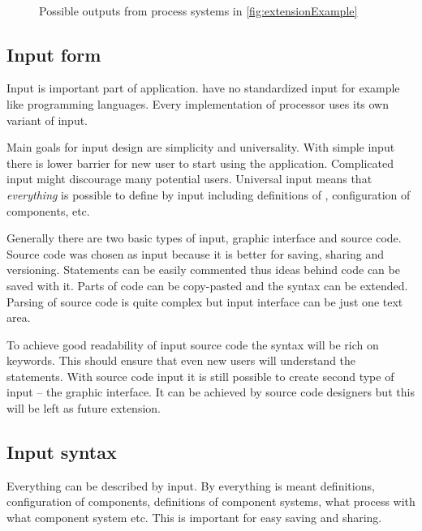 \begin{figure}[h]
	\centering
	 ~
	\caption{Possible outputs from process systems in \autoref{fig:extensionExample}}
	\label{fig:extensionExampleResult}
\end{figure}



\subsection{Input form}

Input is important part of application.
\lsystems have no standardized input for example like programming languages.
Every implementation of \lsystem processor uses its own variant of input.

Main goals for input design are simplicity and universality.
With simple input there is lower barrier for new user to start using the application.
Complicated input might discourage many potential users.
Universal input means that \textit{everything} is possible to define by input including definitions of \lsystems, configuration of components, etc.

Generally there are two basic types of input, graphic interface and source code.
Source code was chosen as input because it is better for saving, sharing and versioning.
Statements can be easily commented thus ideas behind code can be saved with it.
Parts of code can be copy-pasted and the syntax can be extended.
Parsing of source code is quite complex but input interface can be just one text area.

To achieve good readability of input source code the syntax will be rich on keywords.
This should ensure that even new users will understand the statements.
With source code input it is still possible to create second type of input -- the graphic interface.
It can be achieved by source code designers but this will be left as future extension.


\subsection{Input syntax}

Everything can be described by input.
By everything is meant \lsystem definitions, configuration of components, definitions of component systems, what \lsystem process with what component system etc.
This is important for easy saving and sharing.

